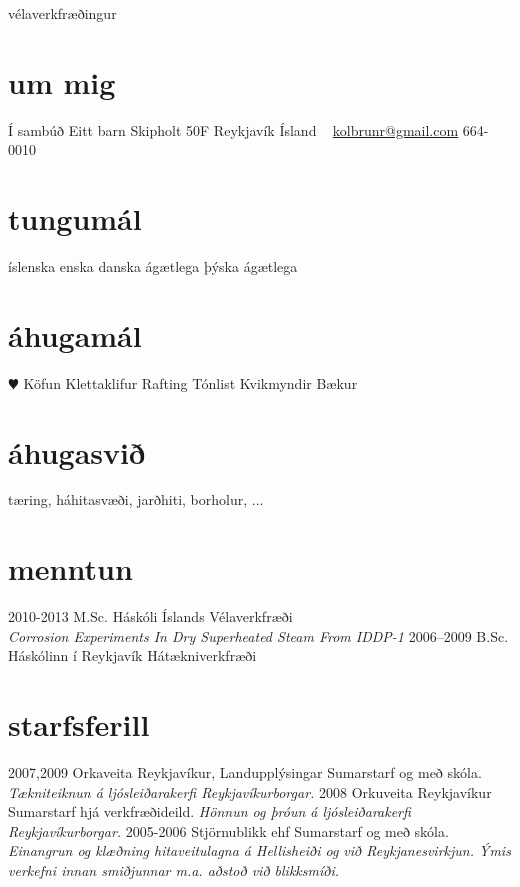 \documentclass[]{friggeri-cv}
\begin{document}
       {vélaverkfræðingur}


\begin{aside}
  \section{um mig}
    Í sambúð
    Eitt barn
    Skipholt 50F
    Reykjavík
    Ísland
    ~
    \href{mailto:kolbrunr@gmail.com}{kolbrunr@gmail.com}
    664-0010
  \section{tungumál}
    íslenska
    enska
    danska ágætlega
    þýska ágætlega
  \section{áhugamál}
    {\color{red} $\varheartsuit$} Köfun
    Klettaklifur
    Rafting
    Tónlist
    Kvikmyndir
    Bækur
\end{aside}

\section{áhugasvið}

tæring, háhitasvæði, jarðhiti, borholur, ...

\section{menntun}

\begin{entrylist}
  \entry
    {2010-2013}
    {M.Sc.} %
    {Háskóli Íslands}
    {Vélaverkfræði\\
    \emph{Corrosion Experiments In Dry Superheated Steam From IDDP-1}}
  \entry
    {2006–2009}
    {B.Sc.} %
    {Háskólinn í Reykjavík}
    {Hátækniverkfræði}
\end{entrylist}

\section{starfsferill}

\begin{entrylist}
  \entry
    {2007,2009}
    {Orkaveita Reykjavíkur, Landupplýsingar}
    {Sumarstarf og með skóla.}
    {\emph{Tækniteiknun á ljósleiðarakerfi Reykjavíkurborgar.}}
  \entry
    {2008}
    {Orkuveita Reykjavíkur}
    {Sumarstarf hjá verkfræðideild.}
    {\emph{Hönnun og þróun á ljósleiðarakerfi Reykjavíkurborgar.}}
  \entry
    {2005-2006}
    {Stjörnublikk ehf}
    {Sumarstarf og með skóla.}
    {\emph{Einangrun og klæðning hitaveitulagna á Hellisheiði og við Reykjanesvirkjun. Ýmis verkefni innan smiðjunnar m.a. aðstoð við blikksmíði.}}
\end{entrylist}
\end{document}
